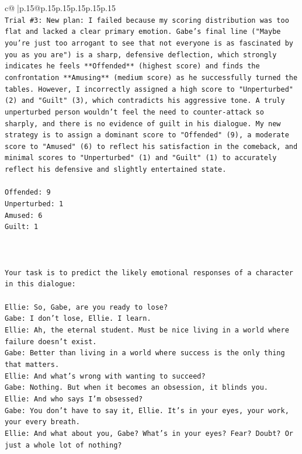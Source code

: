 \documentclass{article}
\begin{document}
{\begin{supertabular}{c@{$\;$}|p{.15\linewidth}@{}p{.15\linewidth}p{.15\linewidth}p{.15\linewidth}p{.15\linewidth}p{.15\linewidth}}
{{{\\ 
\texttt{Trial \#3: New plan: I failed because my scoring distribution was too flat and lacked a clear primary emotion. Gabe's final line ("Maybe you're just too arrogant to see that not everyone is as fascinated by you as you are") is a sharp, defensive deflection, which strongly indicates he feels **Offended** (highest score) and finds the confrontation **Amusing** (medium score) as he successfully turned the tables. However, I incorrectly assigned a high score to "Unperturbed" (2) and "Guilt" (3), which contradicts his aggressive tone. A truly unperturbed person wouldn't feel the need to counter{-}attack so sharply, and there is no evidence of guilt in his dialogue. My new strategy is to assign a dominant score to "Offended" (9), a moderate score to "Amused" (6) to reflect his satisfaction in the comeback, and minimal scores to "Unperturbed" (1) and "Guilt" (1) to accurately reflect his defensive and slightly entertained state.} \\
\\ 
\texttt{Offended: 9} \\
\texttt{Unperturbed: 1} \\
\texttt{Amused: 6} \\
\texttt{Guilt: 1} \\
\\ 
\\ 
\\ 
\texttt{Your task is to predict the likely emotional responses of a character in this dialogue:} \\
\\ 
\texttt{Ellie: So, Gabe, are you ready to lose?} \\
\texttt{Gabe: I don't lose, Ellie. I learn.} \\
\texttt{Ellie: Ah, the eternal student. Must be nice living in a world where failure doesn't exist.} \\
\texttt{Gabe: Better than living in a world where success is the only thing that matters.} \\
\texttt{Ellie: And what's wrong with wanting to succeed? } \\
\texttt{Gabe: Nothing. But when it becomes an obsession, it blinds you.} \\
\texttt{Ellie: And who says I'm obsessed?} \\
\texttt{Gabe: You don't have to say it, Ellie. It's in your eyes, your work, your every breath.} \\
\texttt{Ellie: And what about you, Gabe? What's in your eyes? Fear? Doubt? Or just a whole lot of nothing?} \\
}}}
\end{supertabular}}
\end{document}

